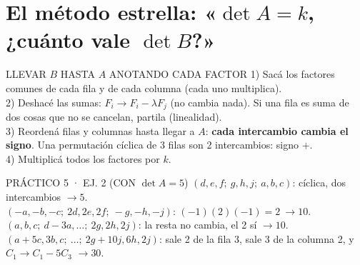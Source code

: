 \section{El método estrella: «$\det A=k$, ¿cuánto vale $\det B$?»}
\begin{metodo}{LLEVAR $B$ HASTA $A$ ANOTANDO CADA FACTOR}
1) Sacá los factores comunes de cada fila y de cada columna (cada uno multiplica).\\
2) Deshacé las sumas: $F_i\to F_i-\lambda F_j$ (no cambia nada). Si una fila es suma de dos cosas que no se cancelan, partila (linealidad).\\
3) Reordená filas y columnas hasta llegar a $A$: \textbf{cada intercambio cambia el signo}. Una permutación cíclica de 3 filas son 2 intercambios: signo $+$.\\
4) Multiplicá todos los factores por $k$.
\end{metodo}
\begin{memo}{PRÁCTICO 5 · EJ. 2 (CON $\det A=5$)}
$(d,e,f;\ g,h,j;\ a,b,c)$: cíclica, dos intercambios $\to5$.\\
$(-a,-b,-c;\ 2d,2e,2f;\ -g,-h,-j)$: $(-1)(2)(-1)=2\ \to10$.\\
$(a,b,c;\ d-3a,\dots;\ 2g,2h,2j)$: la resta no cambia, el 2 sí $\to10$.\\
$(a+5c,3b,c;\ \dots;\ 2g+10j,6h,2j)$: sale 2 de la fila 3, sale 3 de la columna 2, y $C_1\to C_1-5C_3$ $\to30$.
\end{memo}

